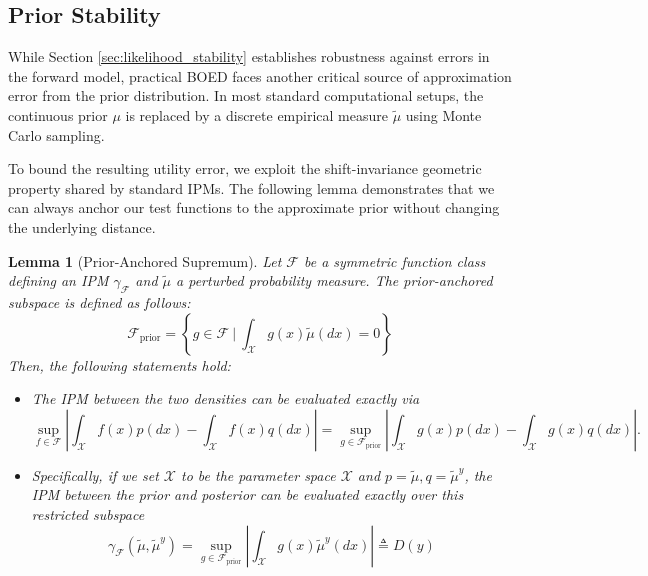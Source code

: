 \documentclass[twoside,11pt]{article}
\newtheorem{lem}{Lemma}[section]
\begin{document}

\subsection{Prior Stability}
While Section \ref{sec:likelihood_stability} establishes robustness against errors in the forward model, practical BOED faces another critical source of approximation error from the prior distribution. In most standard computational setups, the continuous prior $\mu$ is replaced by a discrete empirical measure $\tilde{\mu}$ using Monte Carlo sampling. 

To bound the resulting utility error, we exploit the shift-invariance geometric property shared by standard IPMs. The following lemma demonstrates that we can always anchor our test functions to the approximate prior without changing the underlying distance.

\begin{lem}[Prior-Anchored Supremum] \label{lem:anchor}
    Let $\mathcal{F}$ be a symmetric function class defining an IPM $\gamma_{\mathcal{F}}$ and $\tilde{\mu}$ a perturbed probability measure. The prior-anchored subspace is defined as follows:
    $$\mathcal{F}_{\text{prior}} = \left\{ g \in \mathcal{F} \ \Big| \ \int_{\mathcal{X}} g(x) \tilde{\mu}(dx) = 0 \right\}$$
    Then, the following statements hold:
    \begin{itemize}
        \item The IPM between the two densities can be evaluated exactly via
        $$\sup_{f \in \mathcal{F}} \left| \int_{\mathcal{X}} f(x) p(dx) - \int_{\mathcal{X}} f(x) q(dx) \right| = \sup_{g \in \mathcal{F}_{\text{prior}}} \left| \int_{\mathcal{X}} g(x) p(dx) - \int_{\mathcal{X}} g(x) q(dx) \right|.$$
        \item Specifically, if we set $\mathcal{X}$ to be the parameter space $\mathcal{X}$ and $p=\tilde{\mu}, q=\tilde{\mu}^y$, the IPM between the prior and posterior can be evaluated exactly over this restricted subspace
        $$\gamma_{\mathcal{F}}(\tilde{\mu}, \tilde{\mu}^y) = \sup_{g \in \mathcal{F}_{\text{prior}}} \left| \int_{\mathcal{X}} g(x) \tilde{\mu}^y(dx) \right| \triangleq D(y)$$
    \end{itemize}
\end{lem}
\end{document}
